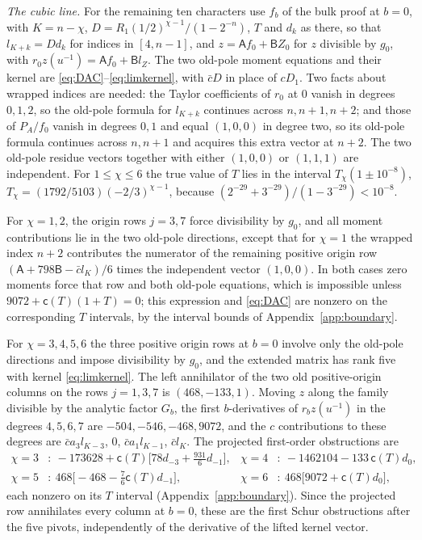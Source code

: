 \documentclass{amsart}
\theoremstyle{definition}
\theoremstyle{remark}
\numberwithin{equation}{section}
\begin{document}
\emph{The cubic line.} For the remaining ten characters use $f_b$ of the bulk proof at
$b=0$, with $K=n-\chi$,
$D=R_1(1/2)^{\chi-1}/(1-2^{-n})$, $T$ and $d_k$ as there, so that $l_{K+k}=Dd_k$ for
indices in $[4,n-1]$, and $z=\mathsf Af_0+\mathsf BZ_0$ for $z$ divisible by $g_0$, with
$r_0z(u^{-1})=\mathsf Af_0+\mathsf Bl_Z$. The two old-pole moment equations and their
kernel are \eqref{eq:DAC}--\eqref{eq:limkernel}, with $\bar cD$ in place of $cD_1$.
Two facts about wrapped indices are needed: the Taylor coefficients of $r_0$ at $0$
vanish in degrees $0,1,2$, so the old-pole formula for $l_{K+k}$ continues across
$n,n+1,n+2$; and those of $P_A/f_0$ vanish in degrees $0,1$ and equal $(1,0,0)$ in degree
two, so its old-pole formula continues across $n,n+1$ and acquires this extra vector at
$n+2$. The two old-pole residue vectors together with either $(1,0,0)$ or $(1,1,1)$ are
independent. For $1\le\chi\le6$ the true value of $T$ lies in the interval
$T_\chi(1\pm10^{-8})$, $T_\chi=(1792/5103)(-2/3)^{\chi-1}$, because
$(2^{-29}+3^{-29})/(1-3^{-29})<10^{-8}$.

For $\chi=1,2$, the origin rows $j=3,7$ force divisibility by $g_0$, and all moment
contributions lie in the two old-pole directions, except that for $\chi=1$ the wrapped
index $n+2$ contributes the numerator of the remaining positive origin row
$(\mathsf A+798\mathsf B-\bar cl_K)/6$ times the independent vector $(1,0,0)$. In both cases
zero moments force that row and both old-pole equations, which is impossible unless
$9072+\mathsf c(T)(1+T)=0$; this expression and \eqref{eq:DAC} are nonzero on the
corresponding $T$ intervals, by the interval bounds of Appendix~\ref{app:boundary}.

For $\chi=3,4,5,6$ the three positive origin rows at $b=0$ involve only the old-pole
directions and impose divisibility by $g_0$, and the extended matrix has rank five with
kernel \eqref{eq:limkernel}. The left annihilator of the two old positive-origin columns
on the rows $j=1,3,7$ is $(468,-133,1)$. Moving $z$ along the family divisible by the
analytic factor $G_b$, the first $b$-derivatives of $r_bz(u^{-1})$ in the degrees
$4,5,6,7$ are $-504,-546,-468,9072$, and the $c$ contributions to these degrees are
$\bar ca_3l_{K-3}$, $0$, $\bar ca_1l_{K-1}$, $\bar cl_K$. The projected first-order
obstructions are
\begin{align*}
  \chi=3&:\ -173628+\mathsf c(T)\bigl[78d_{-3}+\tfrac{931}6d_{-1}\bigr], &
  \chi=4&:\ -1462104-133\,\mathsf c(T)d_0,\\
  \chi=5&:\ 468\bigl[-468-\tfrac76\mathsf c(T)d_{-1}\bigr], &
  \chi=6&:\ 468\bigl[9072+\mathsf c(T)d_0\bigr],
\end{align*}
each nonzero on its $T$ interval (Appendix~\ref{app:boundary}). Since the projected row
annihilates every column at
$b=0$, these are the first Schur obstructions after the five pivots, independently of
the derivative of the lifted kernel vector.
\end{document}
